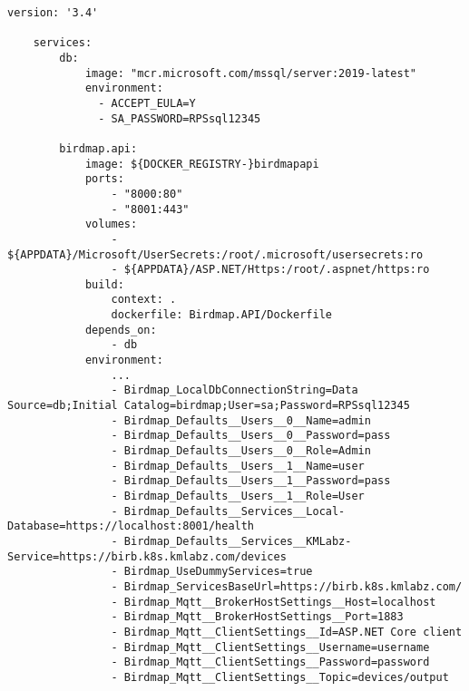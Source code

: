 \begin{lstlisting}[style=docker-compose, caption=A docker-compose.yml fájl tartalma, label=lst:docker-compose]
    version: '3.4'

    services:
        db:
            image: "mcr.microsoft.com/mssql/server:2019-latest"
            environment:
              - ACCEPT_EULA=Y
              - SA_PASSWORD=RPSsql12345
    
        birdmap.api:
            image: ${DOCKER_REGISTRY-}birdmapapi
            ports:
                - "8000:80"
                - "8001:443"
            volumes:
                - ${APPDATA}/Microsoft/UserSecrets:/root/.microsoft/usersecrets:ro
                - ${APPDATA}/ASP.NET/Https:/root/.aspnet/https:ro
            build:
                context: .
                dockerfile: Birdmap.API/Dockerfile
            depends_on:
                - db
            environment:
                ...
                - Birdmap_LocalDbConnectionString=Data Source=db;Initial Catalog=birdmap;User=sa;Password=RPSsql12345
                - Birdmap_Defaults__Users__0__Name=admin
                - Birdmap_Defaults__Users__0__Password=pass
                - Birdmap_Defaults__Users__0__Role=Admin
                - Birdmap_Defaults__Users__1__Name=user
                - Birdmap_Defaults__Users__1__Password=pass
                - Birdmap_Defaults__Users__1__Role=User
                - Birdmap_Defaults__Services__Local-Database=https://localhost:8001/health
                - Birdmap_Defaults__Services__KMLabz-Service=https://birb.k8s.kmlabz.com/devices
                - Birdmap_UseDummyServices=true
                - Birdmap_ServicesBaseUrl=https://birb.k8s.kmlabz.com/
                - Birdmap_Mqtt__BrokerHostSettings__Host=localhost
                - Birdmap_Mqtt__BrokerHostSettings__Port=1883
                - Birdmap_Mqtt__ClientSettings__Id=ASP.NET Core client
                - Birdmap_Mqtt__ClientSettings__Username=username
                - Birdmap_Mqtt__ClientSettings__Password=password
                - Birdmap_Mqtt__ClientSettings__Topic=devices/output
\end{lstlisting}